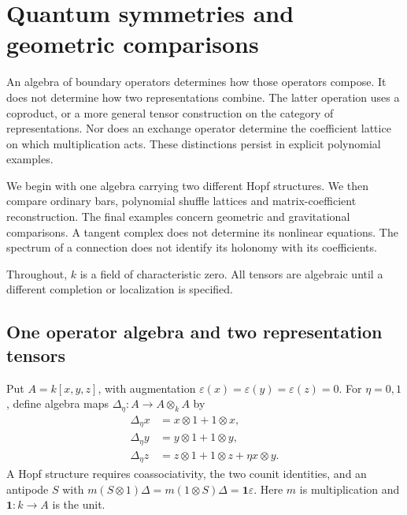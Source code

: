 \chapter{Quantum symmetries and geometric comparisons}
\label{ch:vol2-quantum-interfaces}

An algebra of boundary operators determines how those operators compose.
It does not determine how two representations combine.
The latter operation uses a coproduct, or a more general tensor
construction on the category of representations.
Nor does an exchange operator determine the coefficient lattice on
which multiplication acts. These distinctions persist in explicit
polynomial examples.

We begin with one algebra carrying two different Hopf structures.
We then compare ordinary bars, polynomial shuffle lattices and
matrix-coefficient reconstruction. The final examples concern
geometric and gravitational comparisons.
A tangent complex does not determine its nonlinear equations.
The spectrum of a connection does not identify its holonomy with
its coefficients.

Throughout, $k$ is a field of characteristic zero.
All tensors are algebraic until a different completion or localization
is specified.

\section{One operator algebra and two representation tensors}

Put $A=k[x,y,z]$, with augmentation
$\varepsilon(x)=\varepsilon(y)=\varepsilon(z)=0$.
For $\eta=0,1$, define algebra maps
$\Delta_\eta:A\to A\otimes_k A$ by
\begin{equation}\label{eq:vol2-two-hopf}
\begin{aligned}
 \Delta_\eta x&=x\otimes1+1\otimes x,\\
 \Delta_\eta y&=y\otimes1+1\otimes y,\\
 \Delta_\eta z&=z\otimes1+1\otimes z+\eta x\otimes y.
\end{aligned}
\end{equation}
A Hopf structure requires coassociativity, the two counit identities,
and an antipode $S$ with
$m(S\otimes1)\Delta=m(1\otimes S)\Delta=\mathbf1\varepsilon$.
Here $m$ is multiplication and $\mathbf1:k\to A$ is the unit.

